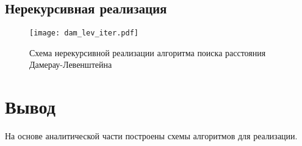 \subsection{Нерекурсивная реализация}
\begin{figure}[H]
	\centering
	\texttt{[image: dam\_lev\_iter.pdf]}
	\caption{Схема нерекурсивной реализации алгоритма поиска расстояния Дамерау-Левенштейна}
	\label{fig:dam_lev_iter}
\end{figure}
\section*{Вывод}

На основе аналитической части построены схемы алгоритмов для реализации.

\clearpage